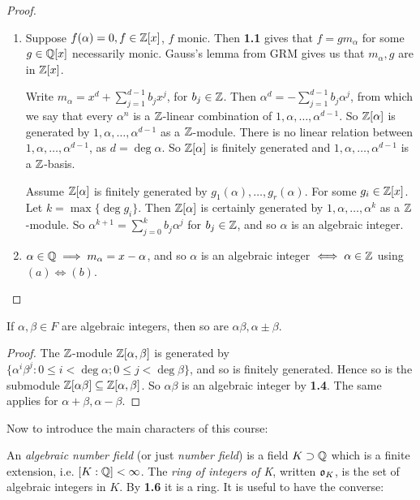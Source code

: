 \documentclass[10pt,a4paper]{article}
\begin{document}
\begin{proof}\item
\begin{enumerate}
\item
\begin{enumerate}
 Suppose $f(\alpha) = 0, f \in \mathbb{Z}[x]$, $f$ monic. Then \textbf{1.1} gives that $f = gm_{\alpha}$ for some $g \in \mathbb{Q}[x]$ necessarily monic. Gauss's lemma from GRM gives us that $m_{\alpha}, g$ are in $\mathbb{Z}[x]$.

 Write $m_{\alpha} = x^d + \sum_{j=1}^{d-1} b_j x^j$, for $b_j \in \mathbb{Z}$. Then $\alpha^d = -\sum_{j=1}^{d-1} b_j \alpha^j$, from which we say that every $\alpha^n$ is a $\mathbb{Z}$-linear combination of $1, \alpha, \ldots, \alpha^{d-1}$. So $\mathbb{Z}[\alpha]$ is generated by $1, \alpha, \ldots, \alpha^{d-1}$ as a $\mathbb{Z}$-module. There is no linear relation between $1, \alpha, \ldots, \alpha^{d-1}$, as $d = \deg \alpha$. So $\mathbb{Z}[\alpha]$ is finitely generated and $1, \alpha, \ldots, \alpha^{d-1}$ is a $\mathbb{Z}$-basis.

 Assume $\mathbb{Z}[\alpha]$ is finitely generated by $g_1(\alpha), \ldots, g_r(\alpha)$. For some $g_i \in \mathbb{Z}[x]$. Let $k = \max\{\deg g_i\}$. Then $\mathbb{Z}[\alpha]$ is certainly generated by $1, \alpha, \ldots, \alpha^k$ as a $\mathbb{Z}$-module. So $\alpha^{k+1} = \sum_{j=0}^k b_j \alpha^j$ for $b_j \in \mathbb{Z}$, and so $\alpha$ is an algebraic integer.
\end{enumerate}
\item $\alpha \in \mathbb{Q} \implies m_{\alpha} = x-\alpha$, and so $\alpha$ is an algebraic integer $\iff \alpha \in \mathbb{Z}$ using $(a) \iff (b)$.
\end{enumerate}
\end{proof}

\begin{theorem}
If $\alpha, \beta \in F$ are algebraic integers, then so are $\alpha\beta, \alpha\pm\beta$.
\end{theorem}
\begin{proof}
The $\mathbb{Z}$-module $\mathbb{Z}[\alpha,\beta]$ is generated by $\{\alpha^i\beta^j : 0 \leq i < \deg \alpha; 0 \leq j < \deg \beta\}$, and so is finitely generated. Hence so is the submodule $\mathbb{Z}[\alpha\beta]\subseteq \mathbb{Z}[\alpha,\beta]$. So $\alpha\beta$ is an algebraic integer by \textbf{1.4}. The same applies for $\alpha+\beta, \alpha-\beta$.
\end{proof}

Now to introduce the main characters of this course:

An \emph{algebraic number field} (or just \emph{number field}) is a field $K \supset \mathbb{Q}$ which is a finite extension, i.e. $[K:\mathbb{Q}] < \infty$. The \emph{ring of integers of K}, written $\mathfrak{o}_K$, is the set of algebraic integers in $K$. By \textbf{1.6} it is a ring. It is useful to have the converse:
\end{document}
